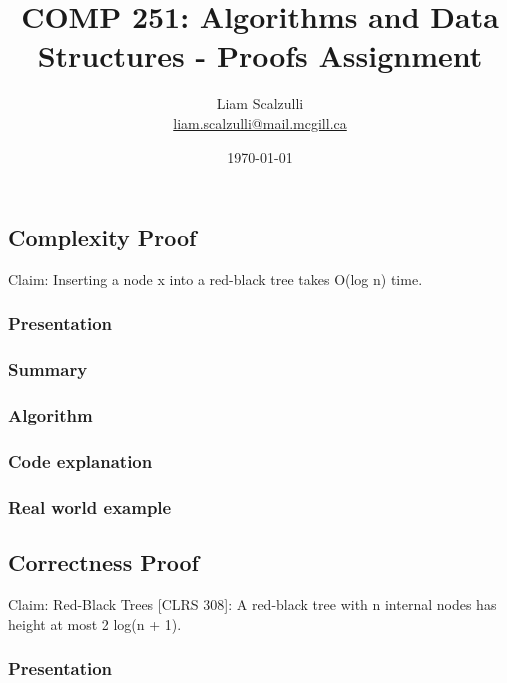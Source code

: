 \documentclass[10pt]{article}
\title{COMP 251: Algorithms and Data Structures - Proofs Assignment}
\author{Liam Scalzulli\\
\href{mailto:liam.scalzulli@mail.mcgill.ca}{liam.scalzulli@mail.mcgill.ca}}
\date{\today}
\begin{document}
\maketitle

\subsection*{Complexity Proof}

Claim: Inserting a node x into a red-black tree takes O(log n) time.

\subsubsection*{Presentation}

\subsubsection*{Summary}

\subsubsection*{Algorithm}

\subsubsection*{Code explanation}

\subsubsection*{Real world example}

\subsection*{Correctness Proof}

Claim: Red-Black Trees [CLRS 308]: A red-black tree with n internal nodes has height at most
2 log(n + 1).

\subsubsection*{Presentation}
\end{document}
